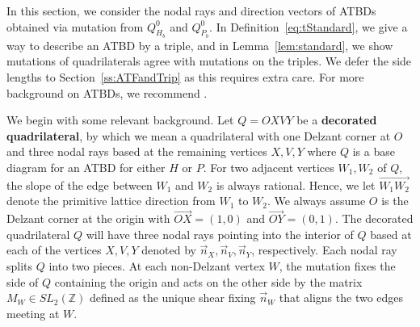 \documentclass[11pt, reqno]{amsart}
\theoremstyle{remark}
\numberwithin{equation}{subsection}
\numberwithin{figure}{section}
\theoremstyle{customremark}
\newcommand{\vn}{{\vec{n}}}
\newcommand{\ovr}{\overrightarrow}
\newcommand{\Z}{\mathbb{Z}}
\begin{document}
In this section, we consider the nodal rays and direction vectors of ATBDs obtained via mutation from $Q_{H_b}^0$ and $Q_{P_b}^0$. In Definition~\ref{eq:tStandard}, we give a way to describe an ATBD by a triple, and in Lemma~\ref{lem:standard}, we show mutations of quadrilaterals agree with mutations on the triples. We defer the side lengths to Section~\ref{ss:ATFandTrip} as this requires extra care. For more background on ATBDs, we recommend \cite{Evans,LS,S}. 

We begin with some relevant background. Let \(Q=OXVY\) be a \textbf{decorated quadrilateral}, by which we mean a
quadrilateral with one Delzant corner at \(O\) and three nodal rays based at the remaining vertices \(X,V,Y\) where $Q$ is a base diagram for an ATBD for either $H$ or $P$. For two adjacent vertices $W_1,W_2$ of $Q,$ the slope of the edge between $W_1$ and $W_2$ is always rational. Hence, we let $\ovr{W_1W_2}$ denote the primitive lattice direction from $W_1$ to $W_2.$ We always assume $O$ is the Delzant corner at the origin with $\ovr{OX}=(1,0)$ and $\ovr{OY}=(0,1).$ The decorated quadrilateral $Q$ will have three nodal rays pointing into the interior of $Q$ based at each of the vertices $X,V,Y$ denoted by $\vn_X,\vn_V,\vn_Y$, respectively. Each nodal ray splits $Q$ into two pieces. At each non-Delzant vertex $W$, the mutation fixes the side of $Q$ containing the origin and acts on the other side by the matrix $M_W \in SL_2(\Z)$ defined as the unique shear fixing $\vn_W$ that aligns the two edges meeting at $W.$ 
\end{document}
